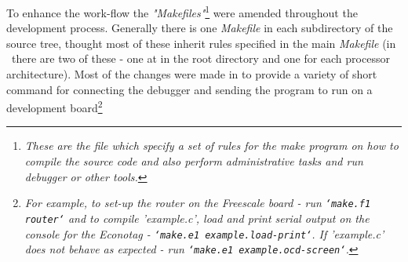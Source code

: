   To enhance the work-flow the \emph{"Makefiles"}\footnote{\emph{These are
 the file which specify a set of rules for the make program on how to
 compile the source code and also perform administrative tasks and run
 debugger or other tools.}} were amended throughout the development
 process. Generally there is one \emph{Makefile} in each subdirectory
 of the source tree, thought most of these inherit rules specified in
 the main \emph{Makefile} (in \Contiki\ there are two of these - one
 at in the root directory and one for each processor architecture).
 Most of the changes were made in 
 to provide a variety of short command for connecting the debugger
 and sending the program to run on a development board\footnote{
 \emph{For example, to set-up the router on the Freescale board - run
 \texttt{`make.f1 router`} and to compile 'example.c', load and print
 serial output on the console for the Econotag  -
 \texttt{`make.e1 example.load-print`}. If 'example.c' does not
 behave as expected - run \texttt{`make.e1 example.ocd-screen`}.}}
 

